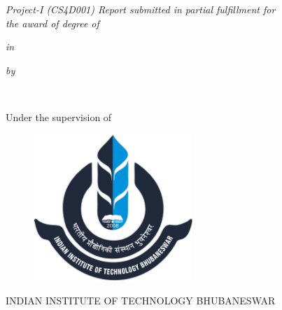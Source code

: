 \thispagestyle{empty}
\begin{center}
\vspace*{0.5cm}
    { \Large {\bfseries {\mytitle}} \par}
\vspace{2\baselineskip}
    {\textit{Project-I (CS4D001) Report submitted in partial fulfillment for}\\
    \textit{the award of degree of}}\par
\vspace{0.2\baselineskip}
    {\bf \degree \par}
\vspace{0.2\baselineskip}
    {\textit{in} \par}
\vspace{0.2\baselineskip}
    {\Large \bf \mydegree \par} 
\vspace{\baselineskip}
    {\textit{by} \par}
\vspace{\baselineskip}
    {{\Large {\bf \myname \\ \myrollno}} \par}
\vspace{1.5\baselineskip}
    {\large Under the supervision of \par}
\vspace{0.3\baselineskip}
    {{\Large \bf \mysupervisor} \par}
\vspace{\baselineskip}
    {\begin{figure}[!h] 
	\centering
	\includegraphics[width=60mm]{./Images/Logo.png} 
     \end{figure}
    }
    \vspace{1.5\baselineskip}
    {\large \MakeUppercase{\mydep} \par}
\vspace*{2ex}
    {\large \uppercase{Indian Institute of Technology Bhubaneswar} \par}
\end{center}